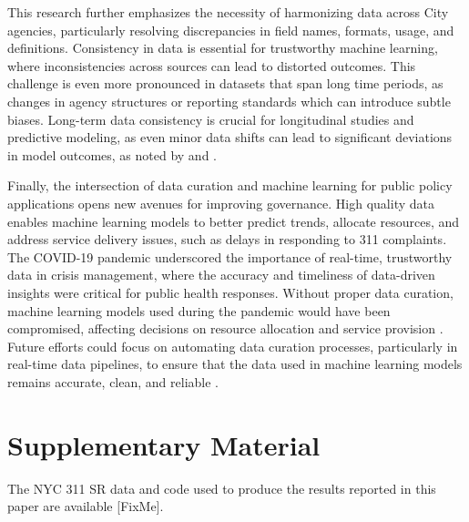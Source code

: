 \documentclass[linenumber]{jdsart}
\begin{document}
This research further emphasizes the necessity of harmonizing data
across City agencies, particularly resolving discrepancies in field
names, formats, usage, and definitions. Consistency in data is essential for
trustworthy machine learning, where inconsistencies across sources can
lead to distorted outcomes. This challenge is even more pronounced in
datasets that span long time periods, as changes in agency structures
or reporting standards which can introduce subtle biases. Long\mbox{-}term data
consistency is crucial for longitudinal studies and predictive
modeling, as even minor data shifts can lead to significant deviations
in model outcomes, as noted by \citet{rahm2000data} and
\citet{borgman2012conundrum}.


Finally, the intersection of data curation and machine learning for
public policy applications opens new avenues for improving governance.
High quality data enables machine learning models to better predict
trends, allocate resources, and address service delivery issues, such
as delays in responding to 311 complaints. The COVID\mbox{-}19 pandemic
underscored the importance of real\mbox{-}time, trustworthy data in crisis
management, where the accuracy and timeliness of data\mbox{-}driven insights
were critical for public health responses. Without proper data
curation, machine learning models used during the pandemic would have
been compromised, affecting decisions on resource allocation and
service provision \citep{worby2020face, khemasuwan2021applications}.
Future efforts could focus on automating data curation processes,
particularly in real\mbox{-}time data pipelines, to ensure that the data used
in machine learning models remains accurate, clean, and reliable
\citep{chu2016data, hurbean2021open}.


\section*{Supplementary Material}
The NYC 311 SR data and code used to produce the results reported in
this paper are available [FixMe].




\end{document}
